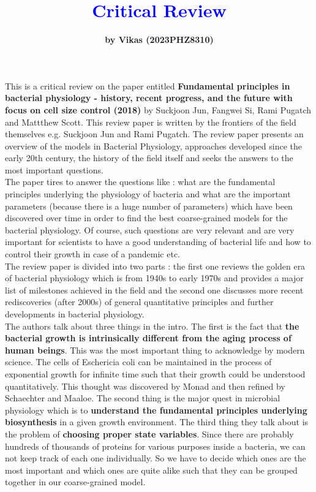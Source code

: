 \documentclass[12pt]{article}
\title{\Huge{\textbf{\textcolor{blue}{Critical Review}}}}
\author{\textbf{by Vikas (2023PHZ8310)}}
\date{}
\begin{document}
\maketitle
	
	This is a critical review on the paper entitled \textbf{Fundamental principles in bacterial physiology - history, recent progress, and the future with focus on cell size control (2018)}\cite{p}  by Suckjoon Jun, Fangwei Si, Rami Pugatch and Mattthew Scott. This review paper is written by the frontiers of the field themselves e.g. Suckjoon Jun and Rami Pugatch. The review paper presents an overview of the models in Bacterial Physiology, approaches developed since the early 20th century, the history of the field itself and seeks the answers to the most important questions.\\
	
	The paper tires to answer the questions like : what are the fundamental principles underlying the physiology of bacteria and what are the important parameters (because there is a huge number of parameters) which have been discovered over time in order to find the best coarse-grained models for the bacterial physiology. Of course, such questions are very relevant and are very important for scientists to have a good understanding of bacterial life and how to control their growth in case of a pandemic etc.\\
	
	The review paper is divided into two parts : the first one reviews the golden era of bacterial physiology which is from 1940s to early 1970s and provides a major list of milestones achieved in the field and the second one discusses more recent rediscoveries (after 2000s) of general quantitative principles and further developments in bacterial physiology.\\
	
	The authors talk about three things in the intro. The first is the fact that \textbf{the bacterial growth is intrinsically different from the aging process of human beings}. This was the most important thing to acknowledge by modern science. The cells of Eschericia coli can be maintained in the process of exponential growth for infinite time such that their growth could be understood quantitatively. This thought was discovered by Monad and then refined by Schaechter and Maaloe. The second thing is the major quest in microbial physiology which is to \textbf{understand the fundamental principles underlying biosynthesis} in a given growth environment. The third thing they talk about is the problem of \textbf{choosing proper state variables}. Since there are probably hundreds of thousands of proteins for various purposes inside a bacteria, we can not keep track of each one individually. So we have to decide which ones are the most important and which ones are quite alike such that they can be grouped together in our coarse-grained model.\\
	
\end{document}
